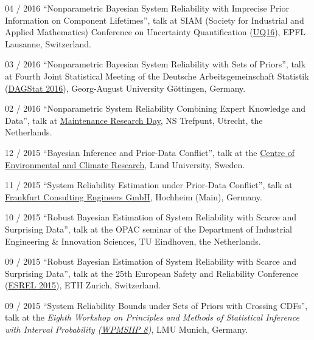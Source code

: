 \documentclass[a4paper]{simplecv}
\begin{document}
\begin{topic}
\item[04 / 2016] ``Nonparametric Bayesian System Reliability with Imprecise Prior Information on Component Lifetimes'', talk at %
                 SIAM (Society for Industrial and Applied Mathematics) Conference on Uncertainty Quantification
                 (\href{http://www.siam.org/meetings/uq16/index.php}{UQ16}),
                 EPFL Lausanne, Switzerland.

\item[03 / 2016] ``Nonparametric Bayesian System Reliability with Sets of Priors'', talk at %
                 Fourth Joint Statistical Meeting of the Deutsche Arbeitsgemeinschaft Statistik
                 (\href{http://www.uni-goettingen.de/dagstat2016}{DAGStat 2016}),
                 Georg-August University G\"{o}ttingen, Germany.

\item[02 / 2016] ``Nonparametric System Reliability Combining Expert Knowledge and Data'', talk at %
                 \href{http://www.maintenanceresearch.nl/}{Maintenance Research Day}, NS Trefpunt, Utrecht, the Netherlands.

\item[12 / 2015] ``Bayesian Inference and Prior-Data Conflict'', talk at %
                 the \href{http://www.cec.lu.se/}{Centre of Environmental and Climate Research},
                 Lund University, Sweden.

\item[11 / 2015] ``System Reliability Estimation under Prior-Data Conflict'', talk at %
                 \href{http://frankfurt-consulting.de/}{Frankfurt Consulting Engineers GmbH},
                 Hochheim (Main), Germany.

\item[10 / 2015] ``Robust Bayesian Estimation of System Reliability with Scarce and Surprising Data'', talk at
                 the OPAC seminar of
                 the Department of Industrial Engineering \& Innovation Sciences, TU Eindhoven, the Netherlands.

\item[09 / 2015] ``Robust Bayesian Estimation of System Reliability with Scarce and Surprising Data'', talk at %
                 the 25th European Safety and Reliability Conference
                 (\href{http://esrel2015.ethz.ch/}{ESREL 2015}),
                 ETH Zurich, Switzerland.

\item[09 / 2015] ``System Reliability Bounds under Sets of Priors with Crossing CDFs'', talk at the %
                 \emph{Eighth Workshop on Principles and Methods of Statistical Inference with Interval Probability (\href{http://www.statistik.lmu.de/wpmsiip_2015/index.html}{WPMSIIP 8})},
                 LMU Munich, Germany.


\end{topic}
\end{document}
